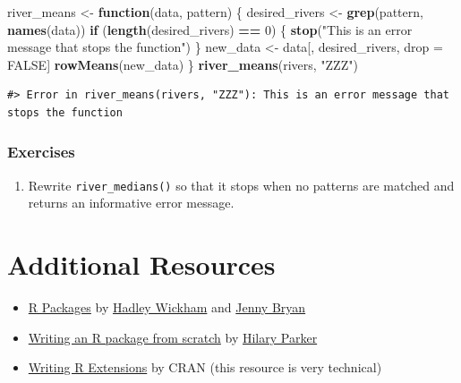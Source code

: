 \documentclass[
]{book}
\newenvironment{Shaded}{\begin{snugshade}}{\end{snugshade}}
\newcommand{\ControlFlowTok}[1]{\textcolor[rgb]{0.13,0.29,0.53}{\textbf{#1}}}
\newcommand{\DecValTok}[1]{\textcolor[rgb]{0.00,0.00,0.81}{#1}}
\newcommand{\KeywordTok}[1]{\textcolor[rgb]{0.13,0.29,0.53}{\textbf{#1}}}
\newcommand{\NormalTok}[1]{#1}
\newcommand{\OperatorTok}[1]{\textcolor[rgb]{0.81,0.36,0.00}{\textbf{#1}}}
\newcommand{\OtherTok}[1]{\textcolor[rgb]{0.56,0.35,0.01}{#1}}
\newcommand{\StringTok}[1]{\textcolor[rgb]{0.31,0.60,0.02}{#1}}
\providecommand{\tightlist}{%
  \setlength{\itemsep}{0pt}\setlength{\parskip}{0pt}}
\begin{document}
\begin{Shaded}
\begin{Highlighting}[]
\NormalTok{river_means <-}\StringTok{ }\ControlFlowTok{function}\NormalTok{(data, pattern) \{}
\NormalTok{  desired_rivers <-}\StringTok{ }\KeywordTok{grep}\NormalTok{(pattern, }\KeywordTok{names}\NormalTok{(data))}
  \ControlFlowTok{if}\NormalTok{ (}\KeywordTok{length}\NormalTok{(desired_rivers) }\OperatorTok{==}\StringTok{ }\DecValTok{0}\NormalTok{) \{}
    \KeywordTok{stop}\NormalTok{(}\StringTok{"This is an error message that stops the function"}\NormalTok{)}
\NormalTok{  \}}
\NormalTok{  new_data <-}\StringTok{ }\NormalTok{data[, desired_rivers, drop =}\StringTok{ }\OtherTok{FALSE}\NormalTok{]}
  \KeywordTok{rowMeans}\NormalTok{(new_data)}
\NormalTok{\}}
\KeywordTok{river_means}\NormalTok{(rivers, }\StringTok{"ZZZ"}\NormalTok{)}
\end{Highlighting}
\end{Shaded}

\begin{verbatim}
#> Error in river_means(rivers, "ZZZ"): This is an error message that stops the function
\end{verbatim}

\hypertarget{exercises-4}{%
\subsubsection{Exercises}\label{exercises-4}}

\begin{enumerate}
\def\labelenumi{\arabic{enumi}.}
\tightlist
\item
  Rewrite \texttt{river\_medians()} so that it stops when no patterns are matched and returns an informative error message.
\end{enumerate}

\hypertarget{additional-resources}{%
\section{Additional Resources}\label{additional-resources}}

\begin{itemize}
\tightlist
\item
  \href{https://r-pkgs.org/index.html}{R Packages} by \href{http://hadley.nz/}{Hadley Wickham} and \href{https://jennybryan.org/}{Jenny Bryan}
\item
  \href{https://hilaryparker.com/2014/04/29/writing-an-r-package-from-scratch/}{Writing an R package from scratch} by \href{https://hilaryparker.com/}{Hilary Parker}
\item
  \href{https://cran.r-project.org/doc/manuals/r-release/R-exts.html}{Writing R Extensions} by CRAN (this resource is very technical)
\end{itemize}
\end{document}

